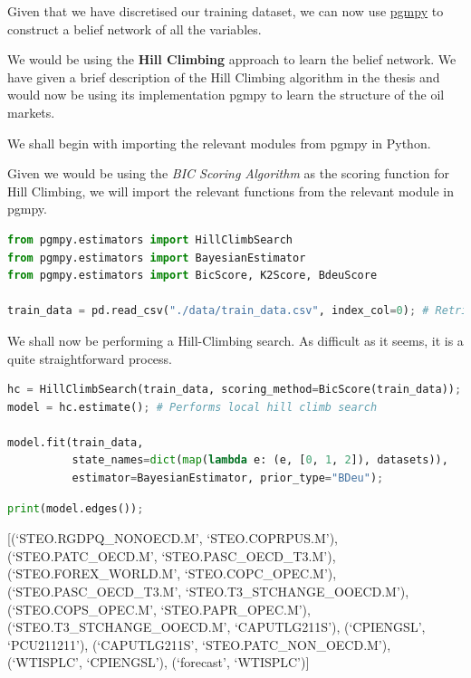 Given that we have discretised our training dataset, we can now use
\href{http://pgmpy.org/}{pgmpy} to construct a belief network of all the
variables.

We would be using the \textbf{Hill Climbing} approach to learn the
belief network. We have given a brief description of the Hill Climbing
algorithm in the thesis and would now be using its implementation pgmpy
to learn the structure of the oil markets.

We shall begin with importing the relevant modules from pgmpy in Python.

Given we would be using the \emph{BIC Scoring Algorithm} as the scoring
function for Hill Climbing, we will import the relevant functions from
the relevant module in pgmpy.

\begin{lstlisting}[language=Python]
from pgmpy.estimators import HillClimbSearch
from pgmpy.estimators import BayesianEstimator
from pgmpy.estimators import BicScore, K2Score, BdeuScore

train_data = pd.read_csv("./data/train_data.csv", index_col=0); # Retrieve training set
\end{lstlisting}

We shall now be performing a Hill-Climbing search. As difficult as it
seems, it is a quite straightforward process.

\begin{lstlisting}[language=Python]
hc = HillClimbSearch(train_data, scoring_method=BicScore(train_data)); #  Initialise Hill Climbing Estimator
model = hc.estimate(); # Performs local hill climb search

model.fit(train_data, 
          state_names=dict(map(lambda e: (e, [0, 1, 2]), datasets)), 
          estimator=BayesianEstimator, prior_type="BDeu");
\end{lstlisting}

\begin{lstlisting}[language=Python]
print(model.edges());
\end{lstlisting}

{[}(`STEO.RGDPQ\_NONOECD.M', `STEO.COPRPUS.M'), (`STEO.PATC\_OECD.M',
`STEO.PASC\_OECD\_T3.M'), (`STEO.FOREX\_WORLD.M', `STEO.COPC\_OPEC.M'),
(`STEO.PASC\_OECD\_T3.M', `STEO.T3\_STCHANGE\_OOECD.M'),
(`STEO.COPS\_OPEC.M', `STEO.PAPR\_OPEC.M'),
(`STEO.T3\_STCHANGE\_OOECD.M', `CAPUTLG211S'), (`CPIENGSL',
`PCU211211'), (`CAPUTLG211S', `STEO.PATC\_NON\_OECD.M'), (`WTISPLC',
`CPIENGSL'), (`forecast', `WTISPLC'){]}

